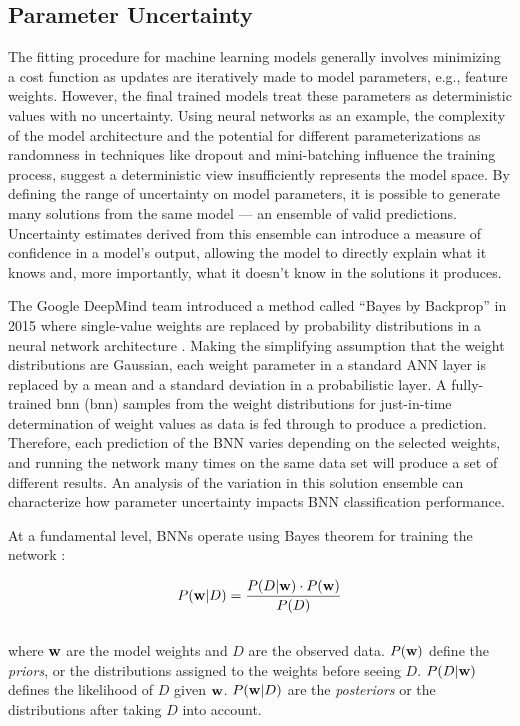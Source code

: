 \subsection{Parameter Uncertainty}\label{ch3:param_uncertainty}
The fitting procedure for machine learning models generally involves minimizing a cost function as updates are iteratively made to model parameters, e.g., feature weights. However, the final trained models treat these parameters as deterministic values with no uncertainty. Using neural networks as an example, the complexity of the model architecture and the potential for different parameterizations as randomness in techniques like dropout and mini-batching influence the training process, suggest a deterministic view insufficiently represents the model space. By defining the range of uncertainty on model parameters, it is possible to generate many solutions from the same model --- an ensemble of valid predictions. Uncertainty estimates derived from this ensemble can introduce a measure of confidence in a model’s output, allowing the model to directly explain what it knows and, more importantly, what it doesn’t know in the solutions it produces.

The Google DeepMind team introduced a method called ``Bayes by Backprop'' in 2015 where single-value weights are replaced by probability distributions in a neural network architecture \citep{blundell_weight_2015}. Making the simplifying assumption that the weight distributions are Gaussian, each weight parameter in a standard ANN layer is replaced by a mean and a standard deviation in a probabilistic layer. A fully-trained \acrlong{bnn} (\acrshort{bnn}) samples from the weight distributions for just-in-time determination of weight values as data is fed through to produce a prediction. Therefore, each prediction of the BNN varies depending on the selected weights, and running the network many times on the same data set will produce a set of different results. An analysis of the variation in this solution ensemble can characterize how parameter uncertainty impacts BNN classification performance.

At a fundamental level, BNNs operate using Bayes theorem for training the network \citep{webster_probabilistic_2021}:

\begin{equation}
    \label{eq:bayesrule}
    P({\bf w} \vert D) = \frac{P(D \vert {\bf w}) \cdot P({\bf w})}{P(D)}
\end{equation}
\\
where ${\bf w}$ are the model weights and $D$ are the observed data. $P({\bf w})$ define the \textit{priors}, or the distributions assigned to the weights before seeing $D$. $P(D \vert {\bf w})$ defines the likelihood of $D$ given ${\bf w}$. $P({\bf w} \vert D)$ are the \textit{posteriors} or the distributions after taking $D$ into account.

